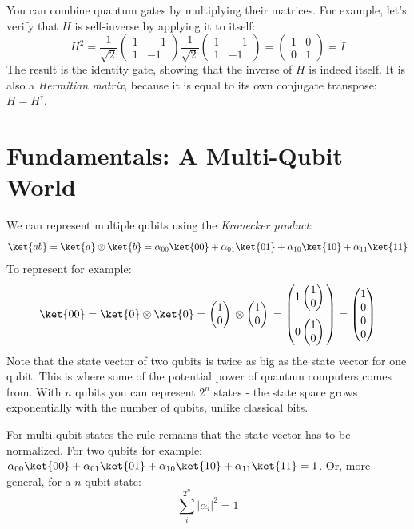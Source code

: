 \documentclass[11pt, notitlepage]{report}
\newcommand{\igate}{
  \begin{pmatrix}
  1 & 0 \\
  0 & 1
  \end{pmatrix}
}
\newcommand{\hgate}{
  \dfrac{1}{\sqrt2}
  \begin{pmatrix}
  1 & \phantom{-}1 \\
  1 & -1
  \end{pmatrix}
}
\newcommand{\qstatezero}{
  \begin{pmatrix}1 \\ 0\end{pmatrix}
}
\begin{document}
You can combine quantum gates by multiplying their matrices. For example, let's verify that $H$ is self-inverse by applying it to itself:
\[
  H^2 = \hgate{} \hgate{} = \igate{} = I
\]
The result is the identity gate, showing that the inverse of $H$ is indeed itself. It is also a \emph{Hermitian matrix}, because it is equal to its own conjugate transpose: $H = H^\dagger$.

\newpage

\chapter{Fundamentals: A Multi-Qubit World}
We can represent multiple qubits using the \emph{Kronecker product}:
\[
  \ket{ab} = \ket{a} \otimes \ket{b} = \alpha_{00}\ket{00} + \alpha_{01}\ket{01} + \alpha_{10}\ket{10} + \alpha_{11}\ket{11}
\]
To represent  for example:
\[
  \ket{00} = \ket{0} \otimes \ket{0} = \qstatezero{} \otimes \qstatezero{} =
  \begin{pmatrix}
  1\qstatezero{} \\[13pt]
  0\qstatezero{}
  \end{pmatrix}
  =
  \begin{pmatrix}
  1 \\
  0 \\
  0 \\
  0
  \end{pmatrix}
\]
Note that the state vector of two qubits is twice as big as the state vector for one qubit. This is where some of the potential power of quantum computers comes from. With $n$ qubits you can represent $2^n$ states - the state space grows exponentially with the number of qubits, unlike classical bits.

For multi-qubit states the rule remains that the state vector has to be normalized. For two qubits for example: $\alpha_{00}\ket{00} + \alpha_{01}\ket{01} + \alpha_{10}\ket{10} + \alpha_{11}\ket{11} = 1$. Or, more general, for a $n$ qubit state:
\[
\sum_{i}^{2^n} |\alpha_i|^2 = 1
\]
\end{document}
